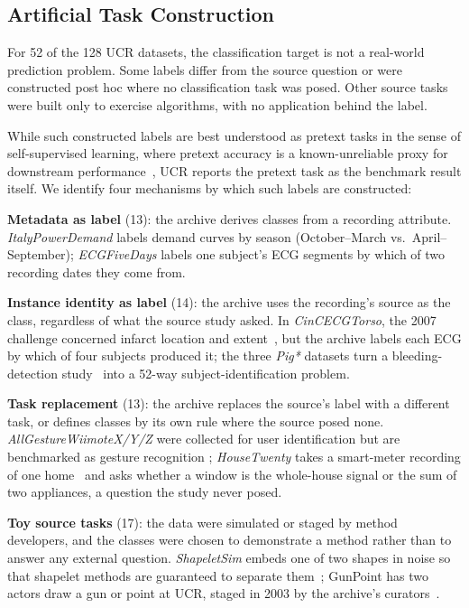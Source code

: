 \documentclass{article}
\begin{document}
\subsection{Artificial Task Construction}\label{sec:construction}
For 52 of the 128 UCR datasets, the classification target is not a real-world prediction problem.
Some labels differ from the source question or were constructed post hoc where no classification task was posed. Other source tasks were built only to exercise algorithms, with no application behind the label.

While such constructed labels are best understood as pretext tasks in the sense of self-supervised learning, where pretext accuracy is a known-unreliable proxy for downstream performance~\citep{Kolesnikov_2019_CVPR}, UCR reports the pretext task as the benchmark result itself.
We identify four mechanisms by which such labels are constructed:

\textbf{Metadata as label} (13): the archive derives classes from a recording attribute.
\emph{ItalyPowerDemand} labels demand curves by season (October--March vs.\ April--September); \emph{ECGFiveDays} labels one subject's ECG segments by which of two recording dates they come from.

\textbf{Instance identity as label} (14): the archive uses the recording's source as the class, regardless of what the source study asked.
In \emph{CinCECGTorso}, the 2007 challenge concerned infarct location and extent~\citep{physionet2007challenge}, but the archive labels each ECG by which of four subjects produced it;
the three \emph{Pig*} datasets turn a bleeding-detection study~\citep{TSCPigs} into a 52-way subject-identification problem.

\textbf{Task replacement} (13): the archive replaces the source's label with a different task, or defines classes by its own rule where the source posed none.
\emph{AllGestureWiimoteX/Y/Z} were collected for user identification but are benchmarked as gesture recognition \citep{allgesturewiimote};
\emph{HouseTwenty} takes a smart-meter recording of one home~\citep{murray2017refit} and asks whether a window is the whole-house signal or the sum of two appliances, a question the study never posed.

\textbf{Toy source tasks} (17): the data were simulated or staged by method developers, and the classes were chosen to demonstrate a method rather than to answer any external question. \emph{ShapeletSim} embeds one of two shapes in noise so that shapelet methods are guaranteed to separate them~\citep{bagnall2016bakeoff}; GunPoint has two actors draw a gun or point at UCR, staged in 2003 by the archive's curators~\citep{dau2019ucr}.
\end{document}

